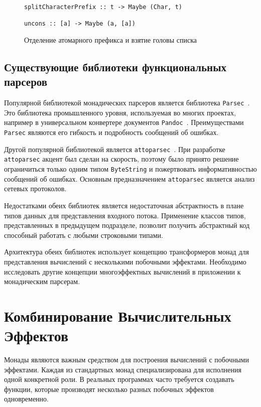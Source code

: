\begin{figure}[h]
\begin{lstlisting}
splitCharacterPrefix :: t -> Maybe (Char, t)

uncons :: [a] -> Maybe (a, [a])
\end{lstlisting}
\caption{Отделение атомарного префикса и взятие головы списка}
\label{listing:Monoid}
\end{figure}

\section{Существующие библиотеки функциональных парсеров}

Популярной библиотекой монадических парсеров является библиотека 
\lstinline{Parsec}~\cite{parsec}. Это библиотека промышленного уровня, 
используемая во многих проектах, например в универсальном конвертере документов 
\lstinline{Pandoc}~\cite{pandoc}. Преимуществами \lstinline{Parsec} являются
 его гибкость и подробность сообщений об ошибках.

Другой популярной библиотекой является 
\lstinline{attoparsec}~\cite{attoparsec}. При разработке 
\lstinline{attoparsec} акцент был сделан на скорость, поэтому было принято 
решение ограничиться только одним типом \lstinline{ByteString} и пожертвовать 
информативностью сообщений об ошибках. Основным предназначением 
\lstinline{attoparsec} является анализ сетевых протоколов.

Недостатками обеих библиотек является недостаточная абстрактность в плане типов
данных для представления входного потока. Применение классов типов, 
представленных в предыдущем подразделе, позволит получить абстрактный код 
способный работать с любыми строковыми типами.

Архитектура обеих библиотек использует концепцию трансформеров монад для 
представления вычислений с несколькими побочными эффектами. Необходимо 
исследовать другие концепции многоэффектных вычислений в приложении к 
монадическим парсерам.

\chapter{Комбинирование Вычислительных Эффектов}

Монады являются важным средством для построения вычислений с побочными 
эффектами. Каждая из стандартных монад специализирована для исполнения
одной конкретной роли. В реальных программах часто требуется создавать функции,
которые производят несколько разных побочных эффектов одновременно.

